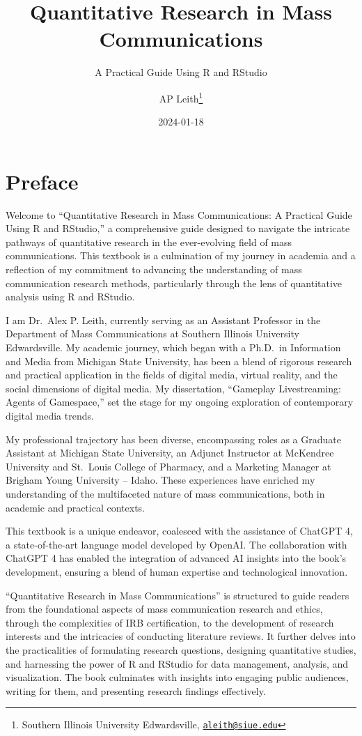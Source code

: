 \documentclass[
]{book}
\title{Quantitative Research in Mass Communications}
\subtitle{A Practical Guide Using R and RStudio}
\author{AP Leith\footnote{Southern Illinois University Edwardsville, \href{mailto:aleith@siue.edu}{\nolinkurl{aleith@siue.edu}}}}
\date{2024-01-18}
\begin{document}
\maketitle

{
\setcounter{tocdepth}{1}
\tableofcontents
}
\hypertarget{preface}{%
\chapter*{Preface}\label{preface}}

Welcome to ``Quantitative Research in Mass Communications: A Practical Guide Using R and RStudio,'' a comprehensive guide designed to navigate the intricate pathways of quantitative research in the ever-evolving field of mass communications. This textbook is a culmination of my journey in academia and a reflection of my commitment to advancing the understanding of mass communication research methods, particularly through the lens of quantitative analysis using R and RStudio.

I am Dr.~Alex P. Leith, currently serving as an Assistant Professor in the Department of Mass Communications at Southern Illinois University Edwardsville. My academic journey, which began with a Ph.D.~in Information and Media from Michigan State University, has been a blend of rigorous research and practical application in the fields of digital media, virtual reality, and the social dimensions of digital media. My dissertation, ``Gameplay Livestreaming: Agents of Gamespace,'' set the stage for my ongoing exploration of contemporary digital media trends.

My professional trajectory has been diverse, encompassing roles as a Graduate Assistant at Michigan State University, an Adjunct Instructor at McKendree University and St.~Louis College of Pharmacy, and a Marketing Manager at Brigham Young University -- Idaho. These experiences have enriched my understanding of the multifaceted nature of mass communications, both in academic and practical contexts.

This textbook is a unique endeavor, coalesced with the assistance of ChatGPT 4, a state-of-the-art language model developed by OpenAI. The collaboration with ChatGPT 4 has enabled the integration of advanced AI insights into the book's development, ensuring a blend of human expertise and technological innovation.

``Quantitative Research in Mass Communications'' is structured to guide readers from the foundational aspects of mass communication research and ethics, through the complexities of IRB certification, to the development of research interests and the intricacies of conducting literature reviews. It further delves into the practicalities of formulating research questions, designing quantitative studies, and harnessing the power of R and RStudio for data management, analysis, and visualization. The book culminates with insights into engaging public audiences, writing for them, and presenting research findings effectively.
\end{document}
